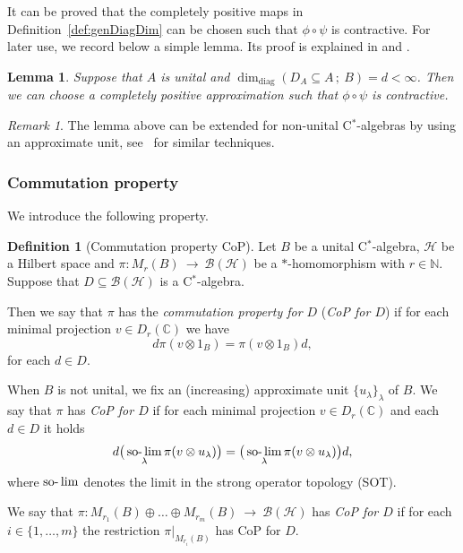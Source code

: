 \documentclass[a4paper]{amsart}
\newcommand{\myhyp}{\textnormal{-}\hskip0pt\relax}
\numberwithin{equation}{section}
\newcommand{\C}{\mathbb{C}}
\newcommand{\Bcal}{\mathcal{B}}
\newcommand{\Hcal}{\mathcal{H}}
\newcommand{\cstar}{C$^\ast$\myhyp{}algebra}
\newcommand{\bop}[1]{\Bcal({#1})}
\newcommand{\rAr}{\longrightarrow}
\DeclareMathOperator{\solim}{\mathrm{so\myhyp{}}\lim}
\newcommand{\ddimn}[3]{\dim_{\mathrm{diag}}({#1}\subseteq{#2}\, ;~{#3})}
\newcommand{\CoProp}[1]{CoP for ${#1}$}
\theoremstyle{plain}
\newtheorem{lem}[thm]{Lemma}
\theoremstyle{indented}
\numberwithin{equation}{section}
\theoremstyle{definition}
\newtheorem{defin}[thm]{Definition}
\theoremstyle{remark}
\newtheorem{rmk}[thm]{Remark}
\theoremstyle{plain}
\theoremstyle{definition}
\begin{document}
\smallskip

It can be proved that the completely positive maps in Definition~\ref{def:genDiagDim} can be chosen such that ${\phi \circ \psi}$ is contractive.
For later use, we record below a simple lemma. Its proof is explained in \cite[Remark~2.2.(ii)]{LiLiaoWinter2023diagDim} and \cite[Remark~2.2.(iv)]{WinterZacharias2010nucDim}.

\begin{lem} \label{lem:cpPhioPsiContractive}
    Suppose that $A$ is unital and ${\ddimn{D_A}{A}{B} = d < \infty}$. Then we can choose a completely positive approximation 
    such that ${\phi \circ \psi}$ is contractive.
\end{lem}

\begin{rmk}
      The lemma above can be extended for non\myhyp{}unital \cstar{}s by using an approximate unit, see~\cite[Remark 2.2.(iv)]{WinterZacharias2010nucDim} for similar techniques.
\end{rmk}

\medskip
\subsubsection{Commutation property}

We introduce the following property. 

\begin{defin}[Commutation property CoP] \label{def:PropP}
    Let $B$ be a unital C$^{\ast}$-algebra, $\Hcal$ be a Hilbert space and ${\pi \colon M_r(B)~\rAr~\bop{\Hcal}}$ be a ${\ast}$\myhyp{}homomorphism with ${r \in \mathbb{N}}$. 
    Suppose that ${D \subseteq \bop{\Hcal}}$ is a \cstar{}.
    
    Then we say that $\pi$ has the \emph{commutation property for $D$} (\emph{\CoProp{D}}) 
    if for each minimal projection ${v \in D_r(\C)}$ 
    we have
    \[{d \pi(v\otimes 1_B)  =\pi(v\otimes 1_B)  d},\]
    for each ${d \in D}$.
    
    When $B$ is not unital, we fix an (increasing) approximate unit ${\{u_\lambda\}_{\lambda}}$ of $B$.
    We say that $\pi$ has \emph{\CoProp{D}} if
    for each minimal projection ${v \in D_r(\C)}$ and each ${d \in D}$ it holds
    \[d  \big(\solim_\lambda \pi(v \otimes u_\lambda) \big) = \big( \solim_\lambda \pi(v \otimes u_\lambda)  \big) d,\]
    where $\solim$ denotes the limit in the strong operator topology (SOT).

    We say that ${\pi \colon M_{r_1}(B)  \oplus \hdots \oplus  M_{r_m}(B)~\rAr~\bop{\Hcal}}$ has \emph{\CoProp{D}} if for each ${i\in \{1,\hdots,m\}}$ the restriction ${\pi|_{M_{r_i}(B)}}$ has \CoProp{D}.
\end{defin}
\end{document}
